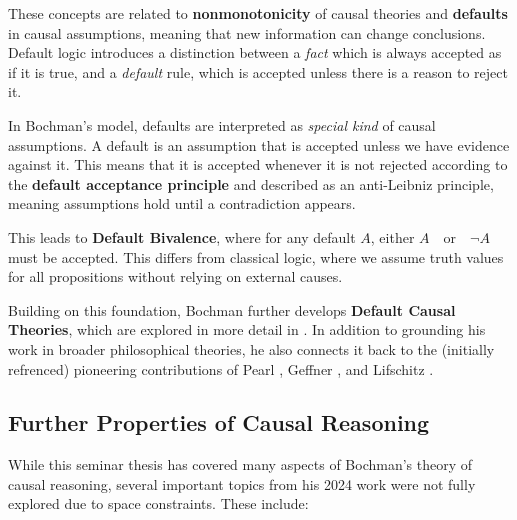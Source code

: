 \documentclass[seminar,palatino,english]{AIGpaper}
\newcommand{\ignore}[1]{}
\begin{document}
These concepts are related to \textbf{nonmonotonicity} of causal theories and \textbf{defaults} in causal assumptions, meaning that new information can change conclusions. Default logic introduces a distinction between a \emph{fact} which is always accepted as if it is true, and a \emph{default} rule, which is accepted unless there is a reason to reject it. 

In Bochman’s model, defaults are interpreted as \textit{special kind} of causal assumptions. A default is an assumption that is accepted unless we have evidence against it. This means that it is accepted whenever it is not rejected according to the \textbf{default acceptance principle} and described as an \glqq{}anti-Leibniz principle\grqq{}\cite{bochman_causal_2024}, meaning assumptions hold until a contradiction appears.

This leads to \textbf{Default Bivalence}, where for any default $A$, either $A \quad \text{or} \quad \neg A$ must be accepted. This differs from classical logic, where we assume truth values for all propositions without relying on external causes.

Building on this foundation, Bochman further develops \textbf{Default Causal Theories}, which are explored in more detail in \cite{bochman_causal_2004}. In addition to grounding his work in broader philosophical theories, he also connects it back to the (initially refrenced) pioneering contributions of Pearl \cite{pearl_embracing_1988}, Geffner \cite{geffner_causal_1990}, and Lifschitz \cite{lifschitz_logic_1997}.

\subsection{Further Properties of Causal Reasoning}

\ignore{
    \begin{itemize}
         \item Defaults: special assumptions.
        \item New truths can invalidate results.
        \item Negation as default.
    \end{itemize}
}

While this seminar thesis has covered many aspects of Bochman's theory of causal reasoning, several important topics from his 2024 work \cite{bochman_causal_2024} were not fully explored due to space constraints. These include:
\end{document}
